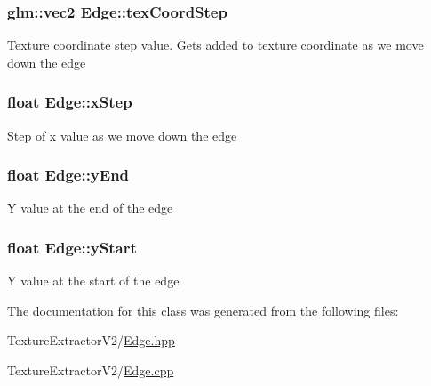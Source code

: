 \subsubsection[{tex\+Coord\+Step}]{\setlength{\rightskip}{0pt plus 5cm}glm\+::vec2 Edge\+::tex\+Coord\+Step}\label{class_edge_ab18d6715948ccf609e0b40f48349b533}
Texture coordinate step value. Gets added to texture coordinate as we move down the edge \hypertarget{class_edge_a56c4a79ba0032fb252f68d30a7374f53}{}
\subsubsection[{x\+Step}]{\setlength{\rightskip}{0pt plus 5cm}float Edge\+::x\+Step}\label{class_edge_a56c4a79ba0032fb252f68d30a7374f53}
Step of x value as we move down the edge \hypertarget{class_edge_a588e6a6d5a5caf93d541dc0db2d9103f}{}
\subsubsection[{y\+End}]{\setlength{\rightskip}{0pt plus 5cm}float Edge\+::y\+End}\label{class_edge_a588e6a6d5a5caf93d541dc0db2d9103f}
Y value at the end of the edge \hypertarget{class_edge_a647499228d18f2e4955d1ebe98221e08}{}
\subsubsection[{y\+Start}]{\setlength{\rightskip}{0pt plus 5cm}float Edge\+::y\+Start}\label{class_edge_a647499228d18f2e4955d1ebe98221e08}
Y value at the start of the edge 

The documentation for this class was generated from the following files\+:\begin{DoxyCompactItemize}
\item 
Texture\+Extractor\+V2/\hyperlink{_edge_8hpp}{Edge.\+hpp}\item 
Texture\+Extractor\+V2/\hyperlink{_edge_8cpp}{Edge.\+cpp}\end{DoxyCompactItemize}
